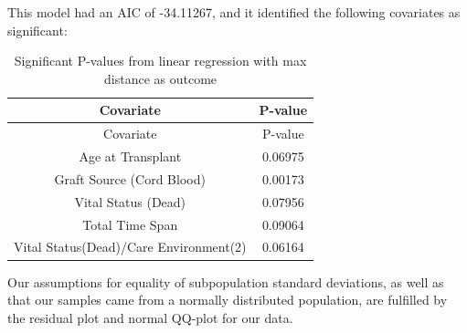 \documentclass[12pt,twoside]{dukestatscithesis}
\begin{document}
This model had an AIC of -34.11267, and it identified the following
covariates as significant:
\begin{longtable}[]{@{}cc@{}}
\caption{Significant P-values from linear regression with max distance
as outcome}\tabularnewline
\toprule
\begin{minipage}[b]{0.56\columnwidth}\centering\strut
Covariate\strut
\end{minipage} & \begin{minipage}[b]{0.22\columnwidth}\centering\strut
P-value\strut
\end{minipage}\tabularnewline
\midrule
\endfirsthead
\toprule
\begin{minipage}[b]{0.56\columnwidth}\centering\strut
Covariate\strut
\end{minipage} & \begin{minipage}[b]{0.22\columnwidth}\centering\strut
P-value\strut
\end{minipage}\tabularnewline
\midrule
\endhead
\begin{minipage}[t]{0.56\columnwidth}\centering\strut
Age at Transplant\strut
\end{minipage} & \begin{minipage}[t]{0.22\columnwidth}\centering\strut
0.06975\strut
\end{minipage}\tabularnewline
\begin{minipage}[t]{0.56\columnwidth}\centering\strut
Graft Source (Cord Blood)\strut
\end{minipage} & \begin{minipage}[t]{0.22\columnwidth}\centering\strut
0.00173\strut
\end{minipage}\tabularnewline
\begin{minipage}[t]{0.56\columnwidth}\centering\strut
Vital Status (Dead)\strut
\end{minipage} & \begin{minipage}[t]{0.22\columnwidth}\centering\strut
0.07956\strut
\end{minipage}\tabularnewline
\begin{minipage}[t]{0.56\columnwidth}\centering\strut
Total Time Span\strut
\end{minipage} & \begin{minipage}[t]{0.22\columnwidth}\centering\strut
0.09064\strut
\end{minipage}\tabularnewline
\begin{minipage}[t]{0.56\columnwidth}\centering\strut
Vital Status(Dead)/Care Environment(2)\strut
\end{minipage} & \begin{minipage}[t]{0.22\columnwidth}\centering\strut
0.06164\strut
\end{minipage}\tabularnewline
\bottomrule
\end{longtable}
Our assumptions for equality of subpopulation standard deviations, as
well as that our samples came from a normally distributed population,
are fulfilled by the residual plot and normal QQ-plot for our data.
\end{document}
